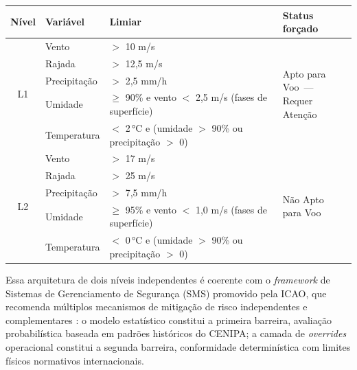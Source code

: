 \documentclass[english,brazilian]{UNISINOSartigo}
\begin{document}
\begin{quadro}[ht]
  \caption{Camada de \textit{overrides} de segurança: limiares operacionais por nível}
  \label{quad:overrides}
  \centering
  \begin{tabular}{cl p{6.5cm} l}
    \toprule
    \textbf{Nível} & \textbf{Variável} & \textbf{Limiar} & \textbf{Status forçado} \\
    \midrule
    \multirow{5}{*}{L1} & Vento        & $>$ 10 m/s                                                         & \multirow{5}{*}{\parbox{3.8cm}{Apto para Voo~---\\Requer Atenção}} \\
                        & Rajada       & $>$ 12,5 m/s                                                       &  \\
                        & Precipitação & $>$ 2,5 mm/h                                                       &  \\
                        & Umidade      & $\geq$ 90\% e vento $<$ 2,5 m/s (fases de superfície)              &  \\
                        & Temperatura  & $<$ 2\,°C e (umidade $>$ 90\% ou precipitação $>$ 0)               &  \\
    \midrule
    \multirow{5}{*}{L2} & Vento        & $>$ 17 m/s                                                         & \multirow{5}{*}{\parbox{3.8cm}{Não Apto\\para Voo}} \\
                        & Rajada       & $>$ 25 m/s                                                         &  \\
                        & Precipitação & $>$ 7,5 mm/h                                                       &  \\
                        & Umidade      & $\geq$ 95\% e vento $<$ 1,0 m/s (fases de superfície)              &  \\
                        & Temperatura  & $<$ 0\,°C e (umidade $>$ 90\% ou precipitação $>$ 0)               &  \\
    \bottomrule
  \end{tabular}
\end{quadro}
Essa arquitetura de dois níveis independentes é coerente com o \textit{framework} de
Sistemas de Gerenciamento de Segurança (SMS) promovido pela ICAO, que recomenda
múltiplos mecanismos de mitigação de risco independentes e complementares
\cite{ZIAKKAS2024,KIRWAN2024}: o modelo estatístico constitui a primeira barreira,
avaliação probabilística baseada em padrões históricos do CENIPA; a camada de
\textit{overrides} operacional constitui a segunda barreira, conformidade
determinística com limites físicos normativos internacionais.
\end{document}
